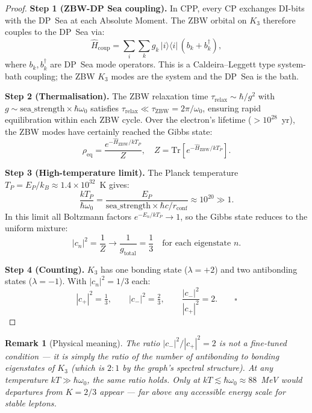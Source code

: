 \documentclass[11pt]{article}
\newtheorem{remark}{Remark}[section]
\newcommand{\ZBW}{\mathrm{ZBW}}
\begin{document}
\begin{proof}
\textbf{Step 1 (ZBW-DP Sea coupling).}
In CPP, every CP exchanges DI-bits with the DP~Sea at each Absolute Moment.
The ZBW orbital on $K_3$ therefore couples to the DP~Sea via:
\begin{equation}
\hat{H}_{\mathrm{coup}} = \sum_{i}\sum_k g_k\,|i\rangle\langle i|\,(b_k + b_k^\dagger),
\end{equation}
where $b_k, b_k^\dagger$ are DP~Sea mode operators.  This is a
Caldeira--Leggett type system-bath coupling; the ZBW $K_3$ modes are
the system and the DP~Sea is the bath.

\textbf{Step 2 (Thermalisation).}
The ZBW relaxation time $\tau_{\mathrm{relax}} \sim \hbar/g^2$ with
$g \sim \mathrm{sea\_strength}\times\hbar\omega_0$ satisfies
$\tau_{\mathrm{relax}} \ll \tau_{\mathrm{ZBW}} = 2\pi/\omega_0$,
ensuring rapid equilibration within each ZBW cycle.  Over the
electron's lifetime ($> 10^{28}$~yr), the ZBW modes have certainly
reached the Gibbs state:
\begin{equation}
\rho_{\mathrm{eq}} = \frac{e^{-\hat{H}_\ZBW/kT_P}}{Z},
\quad Z = \mathrm{Tr}\!\left[e^{-\hat{H}_\ZBW/kT_P}\right].
\end{equation}

\textbf{Step 3 (High-temperature limit).}
The Planck temperature $T_P = E_P/k_B \approx 1.4\times10^{32}$~K gives:
\begin{equation}
\frac{kT_P}{\hbar\omega_0} = \frac{E_P}{\mathrm{sea\_strength}\times\hbar c/r_{\mathrm{conf}}}
\approx 10^{20} \gg 1.
\end{equation}
In this limit all Boltzmann factors $e^{-E_n/kT_P}\to 1$, so the Gibbs
state reduces to the uniform mixture:
\begin{equation}
|c_n|^2 = \frac{1}{Z} \to \frac{1}{g_{\mathrm{total}}} = \frac{1}{3}
\quad \text{for each eigenstate } n.
\end{equation}

\textbf{Step 4 (Counting).}
$K_3$ has one bonding state ($\lambda = +2$) and two antibonding states
($\lambda = -1$).  With $|c_n|^2 = 1/3$ each:
\[
|c_+|^2 = \tfrac{1}{3}, \qquad
|c_-|^2 = \tfrac{2}{3}, \qquad
\frac{|c_-|^2}{|c_+|^2} = 2. \qquad\square
\]
\end{proof}

\begin{remark}[Physical meaning]
The ratio $|c_-|^2/|c_+|^2 = 2$ is not a fine-tuned condition --- it
is simply the ratio of the number of antibonding to bonding eigenstates
of $K_3$ (which is $2{:}1$ by the graph's spectral structure).  At any
temperature $kT \gg \hbar\omega_0$, the same ratio holds.  Only at
$kT \lesssim \hbar\omega_0 \approx 88$~MeV would departures from
$K = 2/3$ appear --- far above any accessible energy scale for
stable leptons.
\end{remark}
\end{document}
